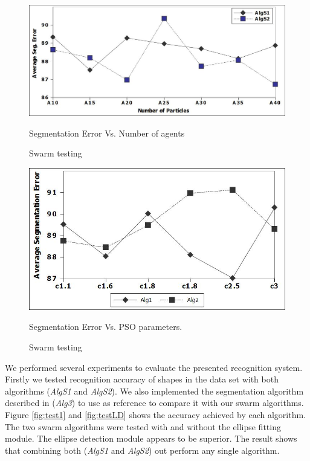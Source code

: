 \documentclass[preprint,10pt,5p,twocolumn]{elsarticle}
\begin{document}
 \begin{figure}
	\centering		
	 \includegraphics[scale=0.3]{images/swarmAgentTest.jpg}
	 	\caption{Swarm testing} Segmentation Error Vs. Number of agents
	 	\label{fig:swarmtesting}
\end{figure} 

\begin{figure}
	\centering		
	 \includegraphics[scale=0.4]{images/swarmParamterC.jpg}
	 	\caption{Swarm testing} Segmentation Error Vs. PSO parameters.
	 	\label{fig:swarmtesting2}
	
\end{figure} 

We performed several experiments to evaluate the presented recognition system. Firstly we tested recognition accuracy of shapes in the data set with both algorithms (\textsl{AlgS1} and \textsl{AlgS2}). We also implemented the segmentation algorithm described in \cite{earlyprocess} (\textsl{Alg3}) to use as reference to compare it with our swarm algorithms. Figure \ref{fig:test1} and \ref{fig:testLD} shows the accuracy achieved by each algorithm. The two swarm algorithms were tested with and without the ellipse fitting module. The ellipse detection module appears to be superior. The result shows that combining both  (\textsl{AlgS1} and \textsl{AlgS2}) out perform any single algorithm. %
\end{document}
